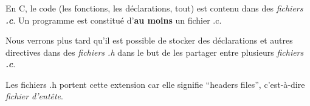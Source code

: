 \begin{frame}
  \frametitle{\secname}
  \framesubtitle{\subsecname}
 
  \par
  En C, le code (les fonctions, les déclarations, tout) est contenu dans des \emph{fichiers \textbf{.c}}. Un programme est constitué d'\textbf{au moins} un fichier .c.
  \vspace{0.5cm}
  \par
  Nous verrons plus tard qu'il est possible de stocker des déclarations et autres directives dans des \emph{fichiers .h} dans le but de les partager entre plusieurs \emph{fichiers \textbf{.c}}.
  \vspace{0.5cm}
  \par
  Les fichiers .h portent cette extension car elle signifie ``headers files'', c'est-à-dire \emph{fichier d'entête}.
\end{frame}
